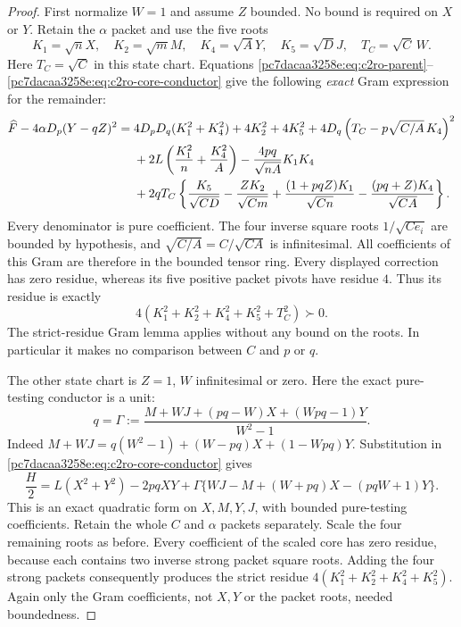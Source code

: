 \begin{proof}
First normalize $W=1$ and assume $Z$ bounded.  No bound is required
on $X$ or $Y$.  Retain the $\alpha$ packet and use the five roots
\[
 K_1=\sqrt nX,\quad K_2=\sqrt mM,\quad
 K_4=\sqrt AY,\quad K_5=\sqrt DJ,\quad T_C=\sqrt C\,W.
\]
Here $T_C=\sqrt C$ in this state chart.  Equations
\eqref{pc7dacaa3258e:eq:c2ro-parent}--\eqref{pc7dacaa3258e:eq:c2ro-core-conductor} give the following
\emph{exact} Gram expression for the remainder:
\begin{align}
\widehat F-4\alpha D_p(Y-qZ)^2={}&
 4D_pD_q(K_1^2+K_4^2)+4K_2^2+4K_5^2
 +4D_q\left(T_C-p\sqrt{C/A}\,K_4\right)^2\notag\\
&+2L\left(\frac{K_1^2}{n}+\frac{K_4^2}{A}\right)
 -\frac{4pq}{\sqrt{nA}}K_1K_4\notag\\
&+2qT_C\left\{
 \frac{K_5}{\sqrt{CD}}-\frac{ZK_2}{\sqrt{Cm}}
 +\frac{(1+pqZ)K_1}{\sqrt{Cn}}
 -\frac{(pq+Z)K_4}{\sqrt{CA}}\right\}.
\label{pc7dacaa3258e:eq:c2ro-Wunit-Gram}
\end{align}
Every denominator is pure coefficient.  The four inverse square roots
$1/\sqrt{Ce_i}$ are bounded by hypothesis, and
$\sqrt{C/A}=C/\sqrt{CA}$ is infinitesimal.
All coefficients of this Gram are therefore in the bounded tensor
ring.  Every displayed correction has zero residue, whereas its five
positive packet pivots have residue $4$.  Thus its residue is exactly
\[
             4(K_1^2+K_2^2+K_4^2+K_5^2+T_C^2)\succ0.
\]
The strict-residue Gram lemma applies without any bound on the roots.
In particular it makes no comparison between $C$ and $p$ or $q$.

The other state chart is $Z=1$, $W$ infinitesimal or zero.  Here the
exact pure-testing conductor is a unit:
\begin{equation}
 q=\Gamma:=\frac{M+WJ+(pq-W)X+(Wpq-1)Y}{W^2-1}.
\label{pc7dacaa3258e:eq:c2ro-Zunit-conductor}
\end{equation}
Indeed $M+WJ=q(W^2-1)+(W-pq)X+(1-Wpq)Y$.
Substitution in \eqref{pc7dacaa3258e:eq:c2ro-core-conductor} gives
\begin{equation}
 \frac H2=L(X^2+Y^2)-2pqXY
 +\Gamma\{WJ-M+(W+pq)X-(pqW+1)Y\}.
\label{pc7dacaa3258e:eq:c2ro-Zunit-core}
\end{equation}
This is an exact quadratic form on $X,M,Y,J$, with bounded pure-testing
coefficients.  Retain the whole $C$ and $\alpha$ packets separately.
Scale the four remaining roots as before.  Every coefficient of the
scaled core has zero residue, because each contains two inverse strong
packet square roots.  Adding the four strong packets consequently
produces the strict residue
$4(K_1^2+K_2^2+K_4^2+K_5^2)$.  Again only the Gram coefficients,
not $X,Y$ or the packet roots, needed boundedness.


\end{proof}
